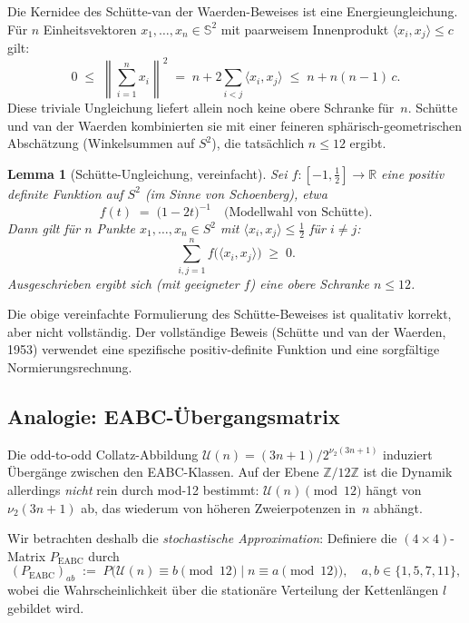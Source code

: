 \documentclass[12pt,a4paper]{article}
\newtheorem{lemma}[definition]{Lemma}
\newcommand{\vii}{\nu_2}
\newcommand{\Z}{\mathbb{Z}}
\newcommand{\R}{\mathbb{R}}
\newcommand{\ZmZ}{\Z/12\Z}
\newcommand{\Ssph}{\mathbb{S}^2}
\begin{document}
Die Kernidee des Schütte-van der Waerden-Beweises ist eine Energieungleichung.
Für $n$ Einheitsvektoren $x_1, \dots, x_n \in \Ssph$ mit paarweisem
Innenprodukt $\langle x_i, x_j \rangle \leq c$ gilt:
\[
  0 \;\leq\; \left\|\sum_{i=1}^{n} x_i\right\|^2
  \;=\; n + 2 \sum_{i < j} \langle x_i, x_j \rangle
  \;\leq\; n + n(n-1)\,c.
\]
Diese triviale Ungleichung liefert allein noch keine obere Schranke für~$n$.
Schütte und van der Waerden kombinierten sie mit einer feineren
sphärisch-geometrischen Abschätzung (Winkelsummen auf $S^2$), die
tatsächlich $n \leq 12$ ergibt.

\begin{lemma}[Schütte-Ungleichung, vereinfacht]
\label{lem:schuette}
Sei $f: [-1, \tfrac{1}{2}] \to \R$ eine \emph{positiv definite}
Funktion auf $S^2$ (im Sinne von Schoenberg), etwa
\[
  f(t) \;=\; \bigl(1 - 2t\bigr)^{-1} \quad \text{(Modellwahl von Schütte)}.
\]
Dann gilt für $n$ Punkte $x_1, \dots, x_n \in S^2$ mit
$\langle x_i, x_j \rangle \leq \tfrac{1}{2}$ für $i \neq j$:
\[
  \sum_{i,j=1}^{n} f\!\bigl(\langle x_i, x_j \rangle\bigr) \;\geq\; 0.
\]
Ausgeschrieben ergibt sich (mit geeigneter $f$) eine obere Schranke
$n \leq 12$.
\end{lemma}

\begin{tcolorbox}[warnung, title={Wichtige Einschränkung}]
Die obige vereinfachte Formulierung des Schütte-Beweises ist qualitativ
korrekt, aber nicht vollständig. Der vollständige Beweis (Schütte und
van der Waerden, 1953) verwendet eine spezifische positiv-definite Funktion
und eine sorgfältige Normierungsrechnung.
\end{tcolorbox}

\subsection{Analogie: EABC-Übergangsmatrix}

Die odd-to-odd Collatz-Abbildung $\mathcal{U}(n) = (3n+1)/2^{\vii(3n+1)}$
induziert Übergänge zwischen den EABC-Klassen.
Auf der Ebene $\ZmZ$ ist die Dynamik allerdings \emph{nicht} rein durch
mod-12 bestimmt: $\mathcal{U}(n) \pmod{12}$ hängt von $\vii(3n+1)$ ab,
das wiederum von höheren Zweierpotenzen in~$n$ abhängt.

Wir betrachten deshalb die \emph{stochastische Approximation}: Definiere
die $(4 \times 4)$-Matrix $P_{\text{EABC}}$ durch
\[
  (P_{\text{EABC}})_{ab} \;:=\; P\bigl(\mathcal{U}(n) \equiv b
  \pmod{12} \;\big|\; n \equiv a \pmod{12}\bigr),
  \quad a, b \in \{1, 5, 7, 11\},
\]
wobei die Wahrscheinlichkeit über die stationäre Verteilung der Kettenlängen
$l$ gebildet wird.
\end{document}
